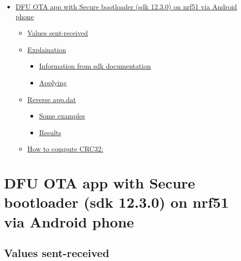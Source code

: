 \begin{itemize}
\tightlist
\item
  \protect\hyperlink{dfu-ota-app-with-secure-bootloader-sdk-1230-on-nrf51-via-android-phone}{DFU
  OTA app with Secure bootloader (sdk 12.3.0) on nrf51 via Android
  phone}

  \begin{itemize}
  \tightlist
  \item
    \protect\hyperlink{values-sent-received}{Values sent-received}
  \item
    \protect\hyperlink{explaination}{Explaination}

    \begin{itemize}
    \tightlist
    \item
      \protect\hyperlink{information-from-sdk-documentation}{Information
      from sdk documentation}
    \item
      \protect\hyperlink{applying}{Applying}
    \end{itemize}
  \item
    \protect\hyperlink{reverse-appdat}{Reverse app.dat}

    \begin{itemize}
    \tightlist
    \item
      \protect\hyperlink{some-examples}{Some examples}
    \item
      \protect\hyperlink{results}{Results}
    \end{itemize}
  \item
    \protect\hyperlink{how-to-compute-crc32}{How to compute CRC32:}
  \end{itemize}
\end{itemize}

\hypertarget{dfu-ota-app-with-secure-bootloader-sdk-12.3.0-on-nrf51-via-android-phone}{%
\section{DFU OTA app with Secure bootloader (sdk 12.3.0) on nrf51 via
Android
phone}\label{dfu-ota-app-with-secure-bootloader-sdk-12.3.0-on-nrf51-via-android-phone}}

\hypertarget{values-sent-received}{%
\subsection{Values sent-received}\label{values-sent-received}}

